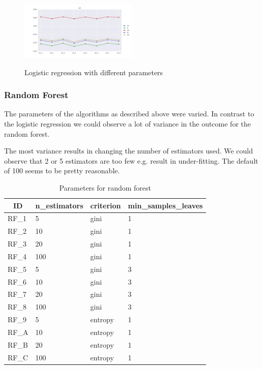 \documentclass{sig-alternate-05-2015}
\begin{document}
\begin{figure}[h]
  \centering
  \caption{Logistic regression with different parameters}
  \includegraphics[width=0.5\textwidth]{../plots/LR_compare_param}
  \label{fig:lr}
\end{figure}

\subsubsection{Random Forest}
The parameters of the algorithms as described above were varied.
In contrast to the logistic regression we could observe a lot of variance in the outcome for the random forest.

The most variance results in changing the number of estimators used. We could observe that 2 or 5 estimators are too few e.g. result in under-fitting. The default of 100 seems to be pretty reasonable.

\begin{table}[]
\centering
\caption{Parameters for random forest}
\label{rf-table}
\begin{tabular}{l|l|l|l}
\multicolumn{1}{c|}{ID} & n\_estimators & criterion & min\_samples\_leaves \\ \hline
RF\_1                    & 5             & gini      & 1                    \\ \hline
RF\_2                    & 10            & gini      & 1                    \\ \hline
RF\_3                    & 20            & gini      & 1                    \\ \hline
RF\_4                    & 100            & gini      & 1                    \\ \hline
RF\_5                    & 5             & gini      & 3                    \\ \hline
RF\_6                    & 10            & gini      & 3                    \\ \hline
RF\_7                    & 20            & gini      & 3                    \\ \hline
RF\_8                    & 100            & gini      & 3                    \\ \hline
RF\_9                    & 5             & entropy      & 1                    \\ \hline
RF\_A                    & 10            & entropy      & 1                    \\ \hline
RF\_B                    & 20            & entropy      & 1                    \\ \hline
RF\_C                    & 100            & entropy      & 1                    
\end{tabular}
\end{table}
\end{document}
